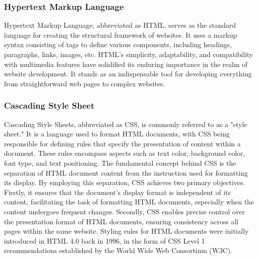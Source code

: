 \documentclass[12pt,oneside,openright,a4paper]{cpe-english-project}
\begin{document}
    \subsubsection{Hypertext Markup Language}
      \qquad Hypertext Markup Language, abbreviated as HTML, serves as the standard language for creating the structural framework of websites. It uses a markup syntax consisting of tags to define various components, including headings, paragraphs, links, images, etc. HTML’s simplicity, adaptability, and compatibility with multimedia features have solidified its enduring importance in the realm of website development. It stands as an indispensable tool for developing everything from straightforward web pages to complex websites.\par

    \subsubsection{Cascading Style Sheet}
      \qquad Cascading Style Sheets, abbreviated as CSS, is commonly referred to as a "style sheet." It is a language used to format HTML documents, with CSS being responsible for defining rules that specify the presentation of content within a document. These rules encompass aspects such as text color, background color, font type, and text positioning. The fundamental concept behind CSS is the separation of HTML document content from the instruction used for formatting its display. By employing this separation, CSS achieves two primary objectives. Firstly, it ensures that the document's display format is independent of its content, facilitating the task of formatting HTML documents, especially when the content undergoes frequent changes. Secondly, CSS enables precise control over the presentation format of HTML documents, ensuring consistency across all pages within the same website. Styling rules for HTML documents were initially introduced in HTML 4.0 back in 1996, in the form of CSS Level 1 recommendations established by the World Wide Web Consortium (W3C).\par

  
\end{document}
